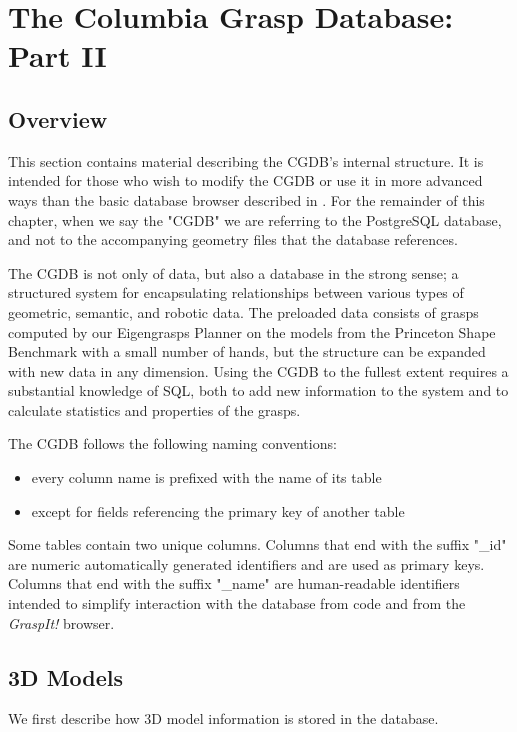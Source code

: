 \section{The Columbia Grasp Database: Part II}
\label{sec:cgdb2}


\subsection{Overview}

This section contains material describing the CGDB's internal
structure. It is intended for those who wish to modify the CGDB or use
it in more advanced ways than the basic database browser described in
. For the
remainder of this chapter, when we say the "CGDB" we are referring to
the PostgreSQL database, and not to the accompanying geometry files
that the database references.

The CGDB is not only of data, but also a database in the strong sense;
a structured system for encapsulating relationships between various
types of geometric, semantic, and robotic data. The preloaded data
consists of grasps computed by our Eigengrasps Planner on the models
from the Princeton Shape Benchmark with a small number of hands, but
the structure can be expanded with new data in any dimension. Using
the CGDB to the fullest extent requires a substantial knowledge of
SQL, both to add new information to the system and to calculate
statistics and properties of the grasps.

The CGDB follows the following naming conventions:
\begin{itemize}
	\item every column name is prefixed with the name of its table
	\item except for fields referencing the primary key of another table
\end{itemize}

Some tables contain two unique columns. Columns that end with the
suffix "\_id" are numeric automatically generated identifiers and are
used as primary keys. Columns that end with the suffix "\_name" are
human-readable identifiers intended to simplify interaction with the
database from code and from the \emph{GraspIt!} browser.

\subsection{3D Models}
We first describe how 3D model information is stored in the database.


